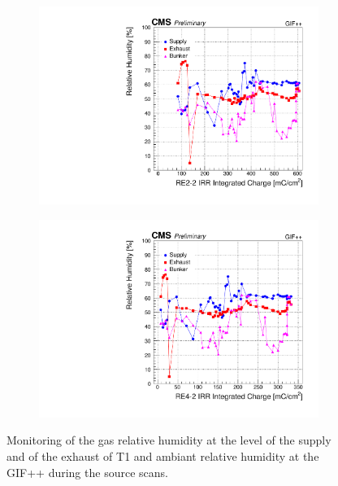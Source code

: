 	\begin{figure}[H]
    	\begin{subfigure}{0.5\linewidth}
    		\centering
			\includegraphics[width = \linewidth]{fig/chapt5/RE2-2-Humidity-monitoring.pdf}
        	\caption{\label{fig:GIFpp-Humidity:A}}
    	\end{subfigure}
    	\begin{subfigure}{0.5\linewidth}
			\centering
    		\includegraphics[width = \linewidth]{fig/chapt5/RE4-2-Humidity-monitoring.pdf}
        	\caption{\label{fig:GIFpp-Humidity:B}}
    	\end{subfigure}
		\caption{\label{fig:GIFpp-Humidity} Monitoring of the gas relative humidity at the level of the supply and of the exhaust of T1 and ambiant relative humidity at the GIF++ during the source scans.}
	\end{figure}

